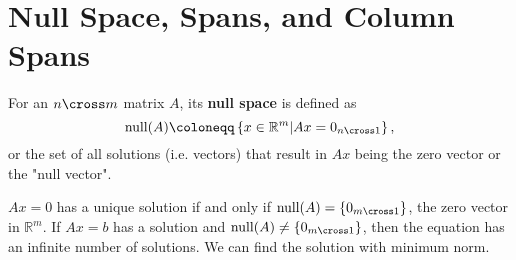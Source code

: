 \section{Null Space, Spans, and Column Spans}

\begin{definition}
	For an \(n \cross m\) matrix \(A\), its \textbf{null space} is defined as
	\[
		\text{null}(A) \coloneqq \left\{ x \in \mathbb{R}^m | Ax = 0_{n \cross 1}\right\}, 
	\] 
	or the set of all solutions (i.e. vectors) that result in \(Ax\) being the zero vector or the "null vector".
\end{definition}
\begin{remark}
	\(Ax=0\) has a unique solution if and only if \(\text{null} (A) = \left\{ 0_{m \cross 1}\right\}\), the zero vector in \(\mathbb{R} ^m\). If \(Ax=b\) has a solution and \(\text{null} (A) \neq \left\{ 0_{m \cross 1} \right\} \), then the equation has an infinite number of solutions. We can find the solution with minimum norm.
\end{remark}

